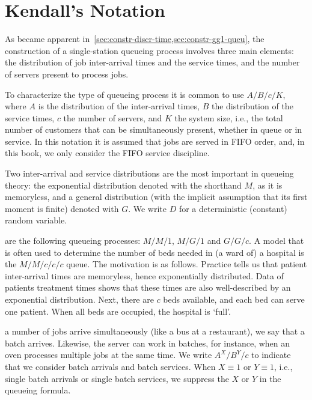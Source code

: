 
\section{Kendall's Notation}
\label{sec:kendalls-notation}

As became apparent in~\cref{sec:constr-discr-time,sec:constr-gg1-queu}, the construction of a single-station queueing process involves three main elements: the distribution of job inter-arrival times and the service times, and the number of servers present to process jobs.



To characterize the type of queueing process it is common to use 
 $A/B/c/K$, where $A$ is the distribution of the
inter-arrival times, $B$ the distribution of the service times, $c$ the
number of servers, and $K$ the system size, i.e., the total number of customers that can be simultaneously present, whether in queue or in service.
In this notation it is assumed that jobs are served in FIFO order, and, in this book, we only consider the FIFO service discipline. 


Two inter-arrival and service distributions are the most important in queueing theory: the exponential distribution denoted with the shorthand $M$, as it is memoryless, and a general distribution (with the implicit assumption that its first moment is finite) denoted with $G$. We write $D$ for a deterministic (constant) random variable. 

 are the following queueing processes: $M/M/1$, $M/G/1$ and $G/G/c$.
A model that is often used to determine the number of beds needed in (a ward of) a hospital is the $M/M/c/c/c$ queue.
The motivation is as follows.
Practice tells us that patient inter-arrival times are memoryless, hence exponentially distributed.
Data of patients treatment times shows that these times are also well-described by an exponential distribution.
Next, there are $c$ beds available, and each bed can serve one patient. When all beds are occupied, the hospital is `full'. 


 a number of jobs arrive simultaneously (like a bus at a restaurant), we say that a batch arrives.
Likewise, the server can work in batches, for instance, when an oven processes multiple jobs at the same time.
We write $A^X/B^Y/c$ to indicate that we consider batch arrivals and batch services. 
When $X\equiv 1$ or $Y \equiv 1$, i.e., single batch arrivals or single batch services, we suppress the $X$ or $Y$ in the queueing formula.



